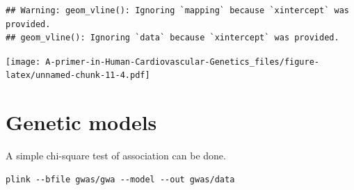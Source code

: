 \documentclass[
]{book}
\newenvironment{Shaded}{\begin{snugshade}}{\end{snugshade}}
\newcommand{\AttributeTok}[1]{\textcolor[rgb]{0.77,0.63,0.00}{#1}}
\newcommand{\ConstantTok}[1]{\textcolor[rgb]{0.00,0.00,0.00}{#1}}
\newcommand{\DecValTok}[1]{\textcolor[rgb]{0.00,0.00,0.81}{#1}}
\newcommand{\FloatTok}[1]{\textcolor[rgb]{0.00,0.00,0.81}{#1}}
\newcommand{\FunctionTok}[1]{\textcolor[rgb]{0.00,0.00,0.00}{#1}}
\newcommand{\NormalTok}[1]{#1}
\newcommand{\OtherTok}[1]{\textcolor[rgb]{0.56,0.35,0.01}{#1}}
\newcommand{\SpecialCharTok}[1]{\textcolor[rgb]{0.00,0.00,0.00}{#1}}
\newcommand{\StringTok}[1]{\textcolor[rgb]{0.31,0.60,0.02}{#1}}
\begin{document}
\begin{Shaded}
\end{Shaded}

\begin{verbatim}
## Warning: geom_vline(): Ignoring `mapping` because `xintercept` was provided.
## geom_vline(): Ignoring `data` because `xintercept` was provided.
\end{verbatim}

\texttt{[image: A-primer-in-Human-Cardiovascular-Genetics\_files/figure-latex/unnamed-chunk-11-4.pdf]}

\hypertarget{genetic-models}{%
\section{Genetic models}\label{genetic-models}}

A simple chi-square test of association can be done.

\begin{verbatim}
plink --bfile gwas/gwa --model --out gwas/data
\end{verbatim}
\end{document}
